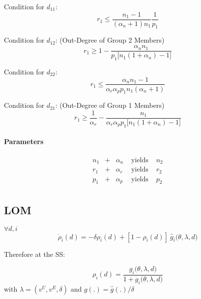 \documentclass[12pt]{article}
\begin{document}
Condition for $d_{11}$:
\begin{equation*}
r_1 \leq \frac{n_1-1}{(\alpha_n+1)n_1}\frac{1}{p_1}
\end{equation*}

Condition for $d_{12}$: (Out-Degree of Group 2 Members)
\begin{equation*}
r_1 \geq 1-\frac{\alpha_n n_1}{p_1 \big[n_1(1+\alpha_n)-1 \big]}
\end{equation*}

Condition for $d_{22}$:
\begin{equation*}
r_1 \leq \frac{\alpha_n n_1-1}{\alpha_r \alpha_p  p_1 n_1 (\alpha_n+1)}
\end{equation*}

Condition for $d_{21}$: (Out-Degree of Group 1 Members)
\begin{equation*}
r_1 \geq \frac{1}{\alpha_r}-\frac{n_1}{\alpha_r \alpha_p p_1 \big[ n_1(1+\alpha_n)-1 \big]}
\end{equation*}

\paragraph{Parameters} 

\begin{equation*}
\begin{array}{lllll}
n_1 & + & \alpha_n & \text{ yields } & n_2 \\
r_1 & + & \alpha_r & \text{ yields } & r_2 \\
p_1 & + & \alpha_p & \text{ yields } & p_2 \\
 \end{array}
\end{equation*}

\subsection{LOM}

$ \forall d, i $
\begin{equation}
\dot{\rho}_i(d) = - \delta \rho_i(d) + [1-\rho_i(d)] \  \hat{g}_i\Big( \theta, \lambda, d \Big)
\end{equation}

Therefore at the SS:

\begin{equation}
\rho_i(d) = \frac{g_i\Big( \theta, \lambda, d \Big)}{1+g_i\Big( \theta, \lambda, d \Big) }
\end{equation}
 with $\lambda=(v^U, v^E, \delta)$ and $g(.)=\hat{g}(.) / \delta$
\end{document}
